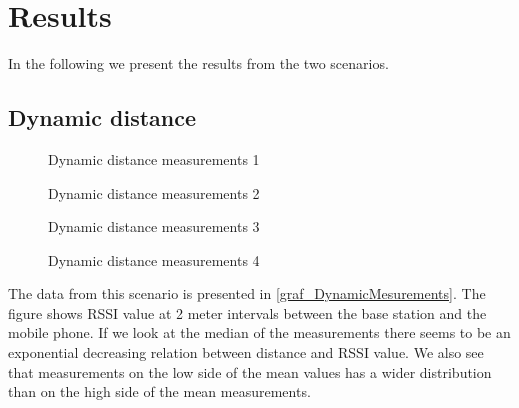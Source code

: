 \section{Results}
\label{sec_results}

In the following we present the results from the two scenarios.

\subsection{Dynamic distance}

\begin{figure}		
	
	
	
	\caption{ Dynamic distance measurements 1 }
	\label{graf_hopper1}
	
\end{figure}

\begin{figure}		
	
	
	
	\caption{ Dynamic distance measurements 2 }
	\label{graf_hopper2}
	
\end{figure}

\begin{figure}		
	
	
	
	\caption{ Dynamic distance measurements 3 }
	\label{graf_hopper3}
	
\end{figure}

\begin{figure}		
	
	
	
	\caption{ Dynamic distance measurements 4 }
	\label{graf_hopper4}
	
\end{figure}

%	
%	
%	
%	

The data from this scenario is presented in \cref{graf_DynamicMesurements}.
The figure shows RSSI value at 2 meter intervals between the base station and the mobile phone.
If we look at the median of the measurements there seems to be an exponential decreasing relation between distance and RSSI value.
We also see that measurements on the low side of the mean values has a wider distribution than on the high side of the mean measurements.

